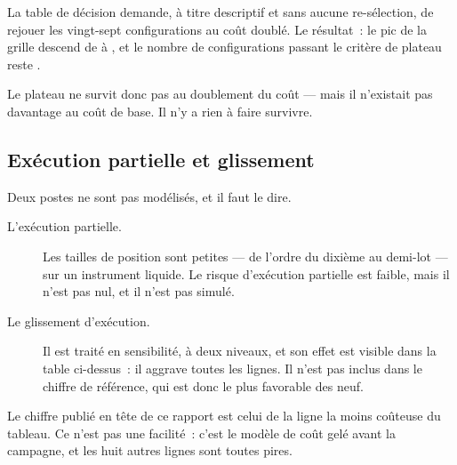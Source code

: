 La table de décision demande, à titre descriptif et sans aucune
re-sélection, de rejouer les vingt-sept configurations au coût doublé. Le
résultat~: le pic de la grille descend de \XTenPeakSharpe{} à
\XTenPeakSharpeSpreadTwo, et le nombre de configurations passant le critère de
plateau reste \XTenPlateauPassingSpreadTwo.

Le plateau ne survit donc pas au doublement du coût --- mais il n'existait pas
davantage au coût de base. Il n'y a rien à faire survivre.

\subsection{Exécution partielle et glissement}

Deux postes ne sont pas modélisés, et il faut le dire.

\begin{description}
  \item[L'exécution partielle.] Les tailles de position sont petites --- de
  l'ordre du dixième au demi-lot --- sur un instrument liquide. Le risque
  d'exécution partielle est faible, mais il n'est pas nul, et il n'est pas
  simulé.
  \item[Le glissement d'exécution.] Il est traité en sensibilité, à deux
  niveaux, et son effet est visible dans la table ci-dessus~: il aggrave
  toutes les lignes. Il n'est pas inclus dans le chiffre de référence, qui est
  donc le plus favorable des neuf.
\end{description}

Le chiffre publié en tête de ce rapport est celui de la ligne la moins
coûteuse du tableau. Ce n'est pas une facilité~: c'est le modèle de coût gelé
avant la campagne, et les huit autres lignes sont toutes pires.
